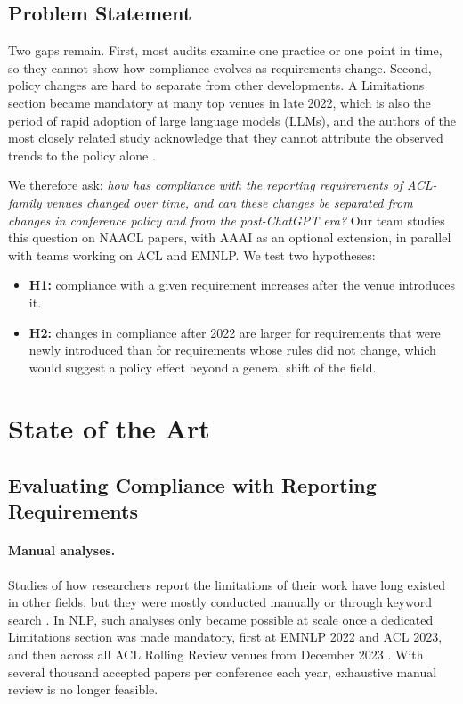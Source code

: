 \documentclass[11pt]{article}
\begin{document}
\subsection{Problem Statement}

Two gaps remain. First, most audits examine one practice or one point in time, so they cannot show how compliance evolves as requirements change. Second, policy changes are hard to separate from other developments. A Limitations section became mandatory at many top venues in late 2022, which is also the period of rapid adoption of large language models (LLMs), and the authors of the most closely related study acknowledge that they cannot attribute the observed trends to the policy alone \cite{thaepprasit-etal-2026-limits}.

We therefore ask: \emph{how has compliance with the reporting requirements of ACL-family venues changed over time, and can these changes be separated from changes in conference policy and from the post-ChatGPT era?} Our team studies this question on NAACL papers, with AAAI as an optional extension, in parallel with teams working on ACL and EMNLP. We test two hypotheses:
\begin{itemize}
\item \textbf{H1:} compliance with a given requirement increases after the venue introduces it.
\item \textbf{H2:} changes in compliance after 2022 are larger for requirements that were newly introduced than for requirements whose rules did not change, which would suggest a policy effect beyond a general shift of the field.
\end{itemize}

\section{State of the Art}

\subsection{Evaluating Compliance with Reporting Requirements}

\paragraph{Manual analyses.}
Studies of how researchers report the limitations of their work have long existed in other fields, but they were mostly conducted manually or through keyword search \cite{thaepprasit-etal-2026-limits}. In NLP, such analyses only became possible at scale once a dedicated Limitations section was made mandatory, first at EMNLP 2022 and ACL 2023, and then across all ACL Rolling Review venues from December 2023 \cite{thaepprasit-etal-2026-limits}. With several thousand accepted papers per conference each year, exhaustive manual review is no longer feasible.
\end{document}
